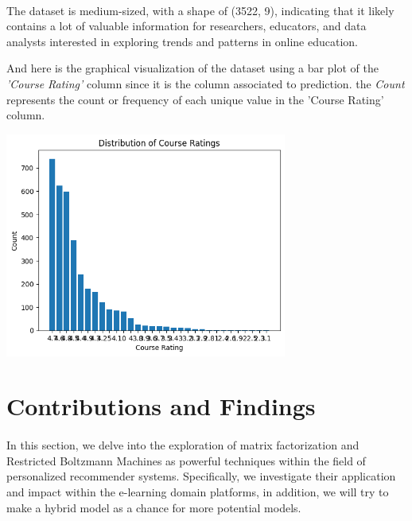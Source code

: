 \documentclass{cup-pan}
\begin{document}
\paragraph{}
The dataset is medium-sized, with a shape of (3522, 9), indicating that it likely contains a lot of valuable information for researchers, educators, and data analysts interested in exploring trends and patterns in online education.

And here is the graphical visualization of the dataset using a bar plot of the \textit{'Course Rating'} column since it is the column associated to prediction. the \textit{Count} represents the count or frequency of each unique value in the 'Course Rating' column.

\begin{center}
  \includegraphics[width=350px]{imgs/figures/25.png}
  \vspace*{.1cm}
\end{center}



\section{Contributions and Findings}
\label{sec:overview}

\paragraph{}
In this section, we delve into the exploration of matrix factorization and Restricted Boltzmann Machines as powerful techniques within the field of personalized recommender systems.
Specifically, we investigate their application and impact within the e-learning domain platforms, in addition, we will try to make a hybrid model as a chance for more potential models.
\end{document}
